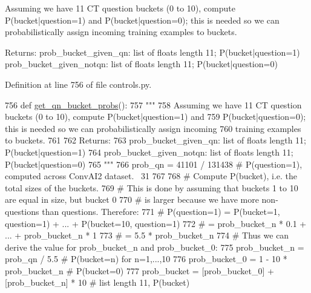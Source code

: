 \begin{DoxyVerb}Assuming we have 11 CT question buckets (0 to 10), compute P(bucket|question=1) and
P(bucket|question=0); this is needed so we can probabilistically assign incoming
training examples to buckets.

Returns:
  prob_bucket_given_qn: list of floats length 11; P(bucket|question=1)
  prob_bucket_given_notqn: list of floats length 11; P(bucket|question=0)
\end{DoxyVerb}
 

Definition at line 756 of file controls.\+py.


\begin{DoxyCode}
756 \textcolor{keyword}{def }\hyperlink{namespaceprojects_1_1controllable__dialogue_1_1controllable__seq2seq_1_1controls_a3a84e701c32a5fbb01d5676714d83f03}{get\_qn\_bucket\_probs}():
757     \textcolor{stringliteral}{"""}
758 \textcolor{stringliteral}{    Assuming we have 11 CT question buckets (0 to 10), compute P(bucket|question=1) and}
759 \textcolor{stringliteral}{    P(bucket|question=0); this is needed so we can probabilistically assign incoming}
760 \textcolor{stringliteral}{    training examples to buckets.}
761 \textcolor{stringliteral}{}
762 \textcolor{stringliteral}{    Returns:}
763 \textcolor{stringliteral}{      prob\_bucket\_given\_qn: list of floats length 11; P(bucket|question=1)}
764 \textcolor{stringliteral}{      prob\_bucket\_given\_notqn: list of floats length 11; P(bucket|question=0)}
765 \textcolor{stringliteral}{    """}
766     prob\_qn = 41101 / 131438  \textcolor{comment}{# P(question=1), computed across ConvAI2 dataset. ~31%
767 
768     \textcolor{comment}{# Compute P(bucket), i.e. the total sizes of the buckets.}
769     \textcolor{comment}{# This is done by assuming that buckets 1 to 10 are equal in size, but bucket 0}
770     \textcolor{comment}{# is larger because we have more non-questions than questions. Therefore:}
771     \textcolor{comment}{# P(question=1) = P(bucket=1, question=1) + ... + P(bucket=10, question=1)}
772     \textcolor{comment}{#               = prob\_bucket\_n * 0.1 + ... + prob\_bucket\_n * 1}
773     \textcolor{comment}{#               = 5.5 * prob\_bucket\_n}
774     \textcolor{comment}{# Thus we can derive the value for prob\_bucket\_n and prob\_bucket\_0:}
775     prob\_bucket\_n = prob\_qn / 5.5  \textcolor{comment}{# P(bucket=n) for n=1,...,10}
776     prob\_bucket\_0 = 1 - 10 * prob\_bucket\_n  \textcolor{comment}{# P(bucket=0)}
777     prob\_bucket = [prob\_bucket\_0] + [prob\_bucket\_n] * 10  \textcolor{comment}{# list length 11, P(bucket)}
}
\end{DoxyCode}
